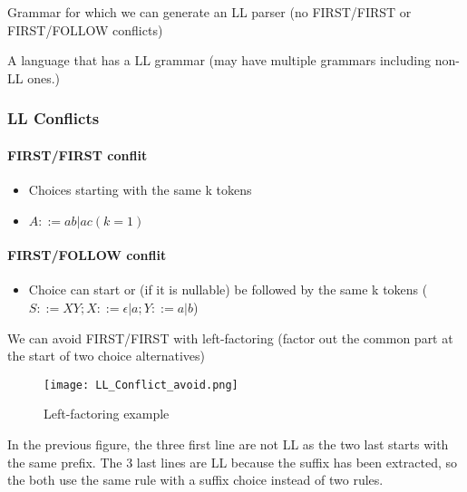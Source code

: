         \theoremstyle{definition}
        \begin{definition}[LL Grammar]
            Grammar for which we can generate an LL parser (no FIRST/FIRST or
            FIRST/FOLLOW conflicts)
        \end{definition}
        \theoremstyle{definition}
        \begin{definition}[LL Language]
            A language that has a LL grammar (may have multiple grammars
            including non-LL ones.)
        \end{definition}
        \subsubsection{LL Conflicts}
            \paragraph{FIRST/FIRST conflit}
                \begin{itemize}
                    \item Choices starting with the same k tokens
                    \item $A ::= ab | ac (k=1)$
                \end{itemize}
            \paragraph{FIRST/FOLLOW conflit}
                \begin{itemize}
                    \item Choice can start or (if it is nullable) be followed by
                    the same k tokens ($S ::= X Y ; X ::= \epsilon | a; Y ::= a | b$)
                \end{itemize}

                We can avoid FIRST/FIRST with left-factoring (factor out the
                common part at the start of two choice alternatives)
                \begin{figure}[H]
                     \centering
                     \texttt{[image: LL\_Conflict\_avoid.png]}
                     \caption{Left-factoring example}
                     \label{fig:left-factoring}
                \end{figure}
                
                In the previous figure, the three first line are not LL as the
                two last starts with the same prefix. The 3 last lines are LL
                because the suffix has been extracted, so the both use the same
                rule with a suffix choice instead of two rules.

